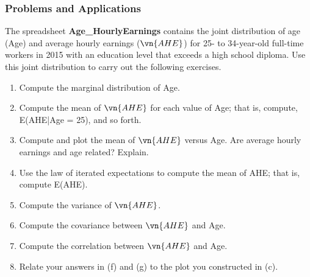 

\begin{frame}
\frametitle{Problems and Applications}
The spreadsheet \textbf{Age\_HourlyEarnings} contains the joint distribution of age (Age) and average hourly earnings ($\vn{AHE}$) for 25- to 34-year-old full-time workers in 2015 with an education level that exceeds a high school diploma. Use this joint distribution to carry out the following exercises.
\begin{enumerate}
\item Compute the marginal distribution of Age.
\item Compute the mean of $\vn{AHE}$ for each value of Age; that is, compute,
E(AHE|Age = 25), and so forth.
\item Compute and plot the mean of $\vn{AHE}$ versus Age. Are average hourly earnings and age related? Explain.
\item Use the law of iterated expectations to compute the mean of AHE; that is, compute E(AHE).
\item Compute the variance of $\vn{AHE}$.
\item Compute the covariance between $\vn{AHE}$ and Age.
\item Compute the correlation between $\vn{AHE}$ and Age.
\item Relate your answers in (f) and (g) to the plot you constructed in (c).
\end{enumerate}
\end{frame}
